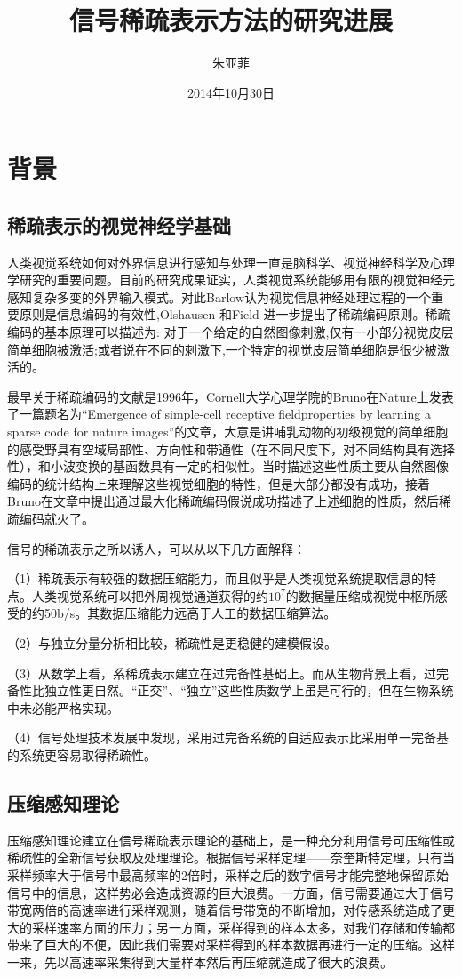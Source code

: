 \documentclass[a4paper,12pt]{article}
\title{信号稀疏表示方法的研究进展}
\author{朱亚菲}
\date{2014年10月30日}
\begin{document}
\maketitle

\section{背景}

\subsection{稀疏表示的视觉神经学基础}

人类视觉系统如何对外界信息进行感知与处理一直是脑科学、视觉神经科学及心理学研究的重要问题。目前的研究成果证实，人类视觉系统能够用有限的视觉神经元感知复杂多变的外界输入模式。对此Barlow认为视觉信息神经处理过程的一个重要原则是信息编码的有效性,Olshausen 和Field 进一步提出了稀疏编码原则。稀疏编码的基本原理可以描述为: 对于一个给定的自然图像刺激,仅有一小部分视觉皮层简单细胞被激活;或者说在不同的刺激下,一个特定的视觉皮层简单细胞是很少被激活的。

最早关于稀疏编码的文献是1996年，Cornell大学心理学院的Bruno在Nature上发表了一篇题名为``Emergence of simple-cell receptive fieldproperties by learning a sparse code for nature images''的文章，大意是讲哺乳动物的初级视觉的简单细胞的感受野具有空域局部性、方向性和带通性（在不同尺度下，对不同结构具有选择性），和小波变换的基函数具有一定的相似性。当时描述这些性质主要从自然图像编码的统计结构上来理解这些视觉细胞的特性，但是大部分都没有成功，接着Bruno在文章中提出通过最大化稀疏编码假说成功描述了上述细胞的性质，然后稀疏编码就火了。

信号的稀疏表示之所以诱人，可以从以下几方面解释：

（1）稀疏表示有较强的数据压缩能力，而且似乎是人类视觉系统提取信息的特点。人类视觉系统可以把外周视觉通道获得的约$10^7$的数据量压缩成视觉中枢所感受的约50b/s。其数据压缩能力远高于人工的数据压缩算法。

（2）与独立分量分析相比较，稀疏性是更稳健的建模假设。

（3）从数学上看，系稀疏表示建立在过完备性基础上。而从生物背景上看，过完备性比独立性更自然。“正交”、“独立”这些性质数学上虽是可行的，但在生物系统中未必能严格实现。

（4）信号处理技术发展中发现，采用过完备系统的自适应表示比采用单一完备基的系统更容易取得稀疏性。

\subsection{压缩感知理论}
压缩感知理论建立在信号稀疏表示理论的基础上，是一种充分利用信号可压缩性或稀疏性的全新信号获取及处理理论。根据信号采样定理——奈奎斯特定理，只有当采样频率大于信号中最高频率的2倍时，采样之后的数字信号才能完整地保留原始信号中的信息，这样势必会造成资源的巨大浪费。一方面，信号需要通过大于信号带宽两倍的高速率进行采样观测，随着信号带宽的不断增加，对传感系统造成了更大的采样速率方面的压力；另一方面，采样得到的样本太多，对我们存储和传输都带来了巨大的不便，因此我们需要对采样得到的样本数据再进行一定的压缩。这样一来，先以高速率采集得到大量样本然后再压缩就造成了很大的浪费。
\end{document}
